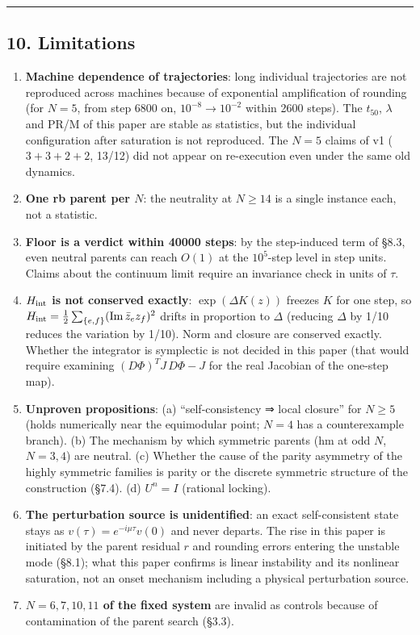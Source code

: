 \documentclass[
  10pt,
  a4paper,
]{article}
\providecommand{\tightlist}{%
  \setlength{\itemsep}{0pt}\setlength{\parskip}{0pt}}
\begin{document}
\begin{center}\rule{0.5\linewidth}{0.5pt}\end{center}

\subsection{10. Limitations}\label{limitations}

\begin{enumerate}
\def\labelenumi{\arabic{enumi}.}
\tightlist
\item
  \textbf{Machine dependence of trajectories}: long individual
  trajectories are not reproduced across machines because of exponential
  amplification of rounding (for \(N=5\), from step 6800 on,
  \(10^{-8}\to10^{-2}\) within 2600 steps). The \(t_{50}\), \(\lambda\)
  and PR/M of this paper are stable as statistics, but the individual
  configuration after saturation is not reproduced. The \(N=5\) claims
  of v1 (\(3+3+2+2\), 13/12) did not appear on re-execution even under
  the same old dynamics.
\item
  \textbf{One rb parent per \(N\)}: the neutrality at \(N\ge14\) is a
  single instance each, not a statistic.
\item
  \textbf{Floor is a verdict within 40000 steps}: by the step-induced
  term of §8.3, even neutral parents can reach \(O(1)\) at the
  \(10^5\)-step level in step units. Claims about the continuum limit
  require an invariance check in units of \(\tau\).
\item
  \textbf{\(H_{\rm int}\) is not conserved exactly}:
  \(\exp(\Delta K(z))\) freezes \(K\) for one step, so
  \(H_{\rm int}=\tfrac12\sum_{\{e,f\}}(\mathrm{Im}\,\bar z_ez_f)^2\)
  drifts in proportion to \(\Delta\) (reducing \(\Delta\) by 1/10
  reduces the variation by 1/10). Norm and closure are conserved
  exactly. Whether the integrator is symplectic is not decided in this
  paper (that would require examining \((D\Phi)^TJ\,D\Phi-J\) for the
  real Jacobian of the one-step map).
\item
  \textbf{Unproven propositions}: (a) ``self-consistency ⇒ local
  closure'' for \(N\ge5\) (holds numerically near the equimodular point;
  \(N=4\) has a counterexample branch). (b) The mechanism by which
  symmetric parents (hm at odd \(N\), \(N=3,4\)) are neutral. (c)
  Whether the cause of the parity asymmetry of the highly symmetric
  families is parity or the discrete symmetric structure of the
  construction (§7.4). (d) \(U^n=I\) (rational locking).
\item
  \textbf{The perturbation source is unidentified}: an exact
  self-consistent state stays as \(v(\tau)=e^{-i\mu\tau}v(0)\) and never
  departs. The rise in this paper is initiated by the parent residual
  \(r\) and rounding errors entering the unstable mode (§8.1); what this
  paper confirms is linear instability and its nonlinear saturation, not
  an onset mechanism including a physical perturbation source.
\item
  \textbf{\(N=6,7,10,11\) of the fixed system} are invalid as controls
  because of contamination of the parent search (§3.3).
\end{enumerate}
\end{document}
